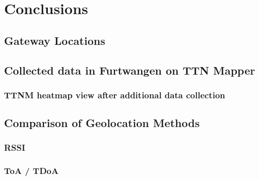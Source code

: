 \chapter{Conclusions}

\section{Gateway Locations}



\section{Collected data in Furtwangen on TTN Mapper}


\subsection{\acl{TTNM} heatmap view after additional data collection}\label{sec:ttm_heatmap_after}


\section{Comparison of Geolocation Methods}


\subsection{\acf{RSSI}}


\subsection{\acf{ToA} / \acf{TDoA}}


